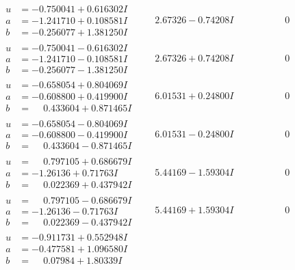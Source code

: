 \documentclass[1p]{elsarticle_modified}
\theoremstyle{definition}
\begin{document}
$$\begin{array}{c|c|c}
\begin{aligned}
u &= -0.750041 + 0.616302 I \\
a &= -1.241710 + 0.108581 I \\
b &= -0.256077 + 1.381250 I\end{aligned}
 & \phantom{-}2.67326 - 0.74208 I & \phantom{-0.000000 } 0 \\ \hline\begin{aligned}
u &= -0.750041 - 0.616302 I \\
a &= -1.241710 - 0.108581 I \\
b &= -0.256077 - 1.381250 I\end{aligned}
 & \phantom{-}2.67326 + 0.74208 I & \phantom{-0.000000 } 0 \\ \hline\begin{aligned}
u &= -0.658054 + 0.804069 I \\
a &= -0.608800 + 0.419900 I \\
b &= \phantom{-}0.433604 + 0.871465 I\end{aligned}
 & \phantom{-}6.01531 + 0.24800 I & \phantom{-0.000000 } 0 \\ \hline\begin{aligned}
u &= -0.658054 - 0.804069 I \\
a &= -0.608800 - 0.419900 I \\
b &= \phantom{-}0.433604 - 0.871465 I\end{aligned}
 & \phantom{-}6.01531 - 0.24800 I & \phantom{-0.000000 } 0 \\ \hline\begin{aligned}
u &= \phantom{-}0.797105 + 0.686679 I \\
a &= -1.26136 + 0.71763 I \\
b &= \phantom{-}0.022369 + 0.437942 I\end{aligned}
 & \phantom{-}5.44169 - 1.59304 I & \phantom{-0.000000 } 0 \\ \hline\begin{aligned}
u &= \phantom{-}0.797105 - 0.686679 I \\
a &= -1.26136 - 0.71763 I \\
b &= \phantom{-}0.022369 - 0.437942 I\end{aligned}
 & \phantom{-}5.44169 + 1.59304 I & \phantom{-0.000000 } 0 \\ \hline\begin{aligned}
u &= -0.911731 + 0.552948 I \\
a &= -0.477581 + 1.096580 I \\
b &= \phantom{-}0.07984 + 1.80339 I\end{aligned}

\end{array}$$
\end{document}

